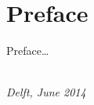 \chapter*{Preface}

Preface\ldots

\begin{flushright}
{\makeatletter\itshape
    \@author \\
    Delft, June 2014
\makeatother}
\end{flushright}

